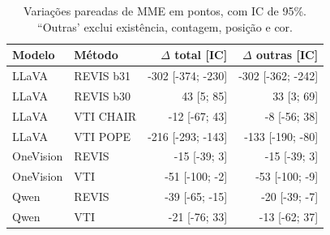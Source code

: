 \begin{table}[t]\centering\small\caption{Variações pareadas de MME em pontos, com IC de 95\%. ``Outras' exclui existência, contagem, posição e cor.}\label{tab:mme}
\setlength{\tabcolsep}{3pt}\begin{tabular}{llrr}\toprule Modelo & Método & $\Delta$ total [IC] & $\Delta$ outras [IC] \\ \midrule
LLaVA & REVIS b31 & -302 [-374; -230] & -302 [-362; -242] \\
LLaVA & REVIS b30 & 43 [5; 85] & 33 [3; 69] \\
LLaVA & VTI CHAIR & -12 [-67; 43] & -8 [-56; 38] \\
LLaVA & VTI POPE & -216 [-293; -143] & -133 [-190; -80] \\
OneVision & REVIS & -15 [-39; 3] & -15 [-39; 3] \\
OneVision & VTI & -51 [-100; -2] & -53 [-100; -9] \\
Qwen & REVIS & -39 [-65; -15] & -20 [-39; -7] \\
Qwen & VTI & -21 [-76; 33] & -13 [-62; 37] \\
\bottomrule\end{tabular}\end{table}
